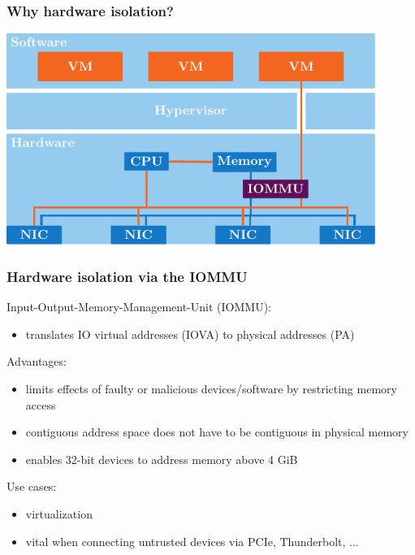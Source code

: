 \begin{frame}
    \frametitle{Why hardware isolation?}

    \begin{center}
        \includegraphics[width=0.9\textwidth]{figures/hypervisor-vms-pt-iommu.pdf}
    \end{center}
\end{frame}

\begin{frame}
    \frametitle{Hardware isolation via the IOMMU}
    Input-Output-Memory-Management-Unit (IOMMU):

    \begin{itemize}
        \item translates IO virtual addresses (IOVA) to physical addresses (PA)
    \end{itemize}

    \vspace{1em}
    Advantages:

    \begin{itemize}
        \item limits effects of faulty or malicious devices/software by
            restricting memory access
        \item contiguous address space does not have to be contiguous in
            physical memory
        \item enables 32-bit devices to address memory above 4 GiB
    \end{itemize}

    \vspace{1em}
    Use cases:

    \begin{itemize}
        \item virtualization
        \item vital when connecting untrusted devices via PCIe, Thunderbolt, ...
    \end{itemize}
\end{frame}

